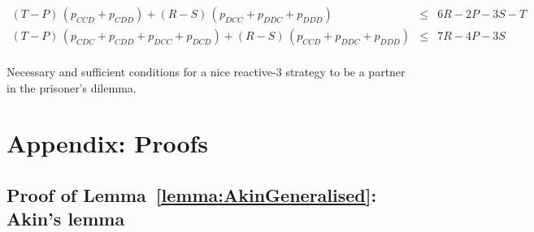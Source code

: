 \documentclass[11pt]{article}
\theoremstyle{plainCl1}
\theoremstyle{plainCl2}
\begin{document}
\begin{table}[t!]
{{\begin{equation*}
\begin{array}{rcl}
    (T - P)\,(p_{CCD} + p_{CDD}) + (R - S)\,(p_{DCC} + p_{DDC} + p_{DDD}) & \le & 6 R \!-\! 2 P \!-\! 3 S \!-\! T \\ [0.2cm]
    (T - P)\,(p_{CDC} + p_{CDD} + p_{DCC} + p_{DCD}) + (R - S)\,(p_{CCD} + p_{DDC} + p_{DDD}) & \le & 7 R \!-\! 4 P \!-\! 3 S \\ [0.2cm]
 \end{array}
 \end{equation*}
 }}
 \caption{Necessary and sufficient conditions for a nice reactive-3 strategy to be a partner in the  prisoner's dilemma.}
 \label{Tab:PartnerReactiveThreePD}
 \end{table}



\clearpage
\newpage




\section{Appendix: Proofs}
\label{section:appendix}


\subsection{Proof of Lemma~\ref{lemma:AkinGeneralised}: Akin's lemma}
\end{document}
